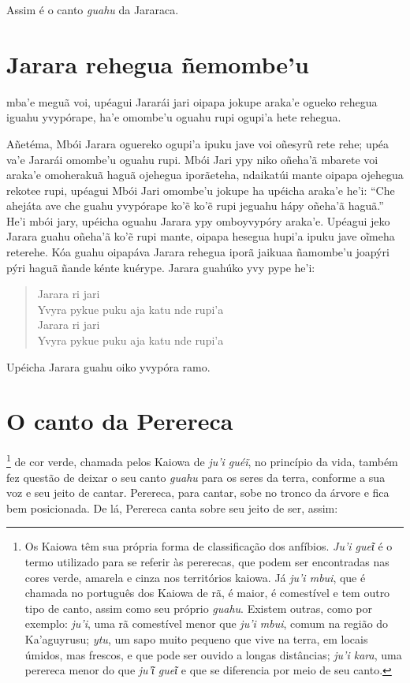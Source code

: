 Assim é o canto \textit{guahu} da Jararaca.


\chapter{Jarara rehegua ñemombe'u}

 mba'e meguã voi, upéagui Jararái jari oipapa jokupe araka'e ogueko
rehegua iguahu yvypórape, ha'e omombe'u oguahu rupi ogupi'a hete
rehegua.


Añetéma, Mbói Jarara oguereko ogupi'a ipuku jave voi oñesyrũ rete rehe;
upéa va'e Jararái omombe'u oguahu rupi. Mbói Jari ypy niko oñeha'ã
mbarete voi araka'e omoherakuã haguã ojehegua iporãeteha, ndaikatúi
mante oipapa ojehegua rekotee rupi, upéagui Mbói Jari omombe'u jokupe ha
upéicha araka'e he'i: ``Che ahejáta ave che guahu yvypórape ko'ẽ ko'ẽ
rupi jeguahu hápy oñeha'ã haguã.'' He'i mbói jary, upéicha oguahu Jarara
ypy omboyvypóry araka'e. Upéagui jeko Jarara guahu oñeha'ã ko'ẽ rupi
mante, oipapa hesegua hupi'a ipuku jave oĩmeha reterehe. Kóa guahu
oipapáva Jarara rehegua iporã jaikuaa ñamombe'u joapýri pýri haguã ñande
kénte kuérype. Jarara guahúko yvy pype he'i:

\begin{verse}
Jarara ri jari\\
Yvyra pykue puku aja katu nde rupi'a\\
Jarara ri jari\\
Yvyra pykue puku aja katu nde rupi'a
\end{verse}


Upéicha Jarara guahu oiko yvypóra ramo.


\chapter{O canto da Perereca}

\footnote{Os Kaiowa têm sua própria forma de classificação dos
  anfíbios. \textit{Ju'i gueῖ} é o termo utilizado para se referir às
  pererecas, que podem ser encontradas nas cores verde, amarela e cinza
  nos territórios kaiowa. Já \textit{ju'i mbui}, que é chamada no
  português dos Kaiowa de rã, é maior, é comestível e tem outro tipo de
  canto, assim como seu próprio \textit{guahu}. Existem outras, como por
  exemplo: \textit{ju'i}, uma rã comestível menor que \textit{ju'i mbui},
  comum na região do Ka'aguyrusu; \textit{ytu}, um sapo muito pequeno que
  vive na terra, em locais úmidos, mas frescos, e que pode ser ouvido a
  longas distâncias; \textit{ju'i kara}, uma perereca menor do que
  \textit{ju'ῖ gueῖ} e que se diferencia por meio de seu canto.} de cor
verde, chamada pelos Kaiowa de \textit{ju'i guéĩ}, no princípio da vida,
também fez questão de deixar o seu canto \textit{guahu} para os seres da
terra, conforme a sua voz e seu jeito de cantar. Perereca, para cantar,
sobe no tronco da árvore e fica bem posicionada. De lá, Perereca canta
sobre seu jeito de ser, assim:

